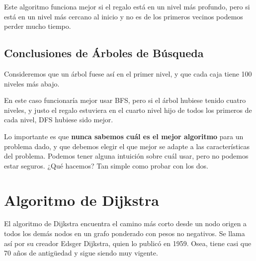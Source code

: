 \documentclass[12pt]{article}
\begin{document}
\vspace{0.3em}

Este algoritmo funciona mejor si el regalo está en un nivel más profundo, pero si está en un nivel más cercano al inicio y no es de los primeros vecinos podemos perder mucho tiempo.

\subsection{Conclusiones de Árboles de Búsqueda}

Consideremos que un árbol fuese así en el primer nivel, y que cada caja tiene 100 niveles más abajo.

\begin{center}
\end{center}

En este caso funcionaría mejor usar BFS, pero si el árbol hubiese tenido cuatro niveles, y justo el regalo estuviera en el cuarto nivel hijo de todos los primeros de cada nivel, DFS hubiese sido mejor.

\vspace{0.5em}

Lo importante es que \textbf{nunca sabemos cuál es el mejor algoritmo} para un problema dado, y que debemos elegir el que mejor se adapte a las características del problema. Podemos tener alguna intuición sobre cuál usar, pero no podemos estar seguros. ¿Qué hacemos? Tan simple como probar con los dos.

\section{Algoritmo de Dijkstra}
El algoritmo de Dijkstra encuentra el camino más corto desde un nodo origen a todos los demás nodos en un grafo ponderado con pesos no negativos. Se llama así por su creador Edsger Dijkstra, quien lo publicó en 1959. Osea, tiene casi que 70 años de antigüedad y sigue siendo muy vigente.
\end{document}
